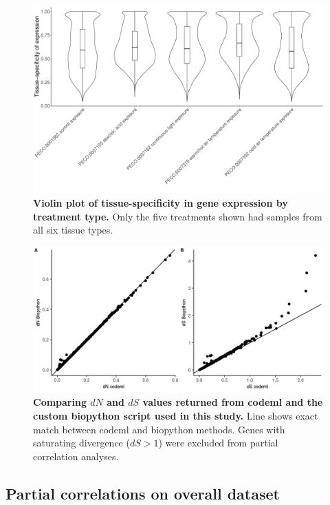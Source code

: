 \documentclass[12pt]{article}
\begin{document}
\newpage

\begin{figure}[H]
\centering
\includegraphics[width = \linewidth]{figures/appendix_a/densityPlotsOfTissueSpecificity.pdf}
\caption{\textbf{Violin plot of tissue-specificity in gene expression by treatment type.} Only the five treatments shown had samples from all six tissue types.}%
\end{figure}

\newpage

\begin{figure}[H]
\centering
\includegraphics[width = \linewidth]{figures/appendix_a/codemlVsBiopythonComparison_2022-08-11.jpeg}
\caption{\textbf{Comparing $dN$ and $dS$ values returned from codeml and the custom biopython script used in this study.} Line shows exact match between codeml and biopython methods. Genes with saturating divergence ($dS > 1$) were excluded from partial correlation analyses.}%
\end{figure}

\subsection*{Partial correlations on overall dataset}
\end{document}
